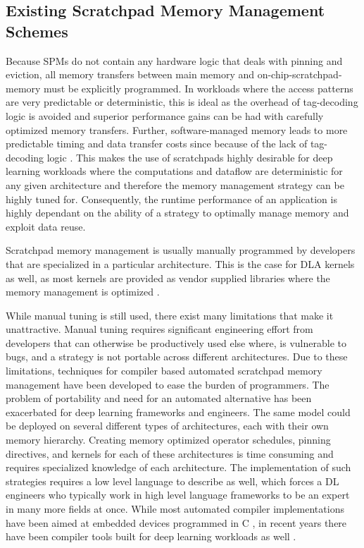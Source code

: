 \subsection{Existing Scratchpad Memory Management Schemes}
Because SPMs do not contain any hardware logic that deals with pinning and
eviction, all memory transfers between main memory and on-chip-scratchpad-memory
must be explicitly programmed. In workloads where the access patterns are very
predictable or deterministic, this is ideal as the overhead of tag-decoding
logic is avoided and superior performance gains can be had with carefully
optimized memory transfers. Further, software-managed memory leads to more
predictable timing and data transfer costs since because of the lack of
tag-decoding logic \cite{graphColoring}. This makes the use of scratchpads
highly desirable for deep learning workloads where the computations and
dataflow are deterministic for any given architecture and therefore the
memory management strategy can be highly tuned for. Consequently,
the runtime performance of an application is highly dependant on the
ability of a strategy to optimally manage memory and exploit data reuse.

Scratchpad memory management is usually manually programmed by developers
that are specialized in a particular architecture. This is the case for
DLA kernels as well, as most kernels are provided as vendor supplied libraries
where the memory management is optimized \cite{TVM}.

While manual tuning is still used, there exist many limitations that make it
unattractive. Manual tuning requires significant engineering effort from
developers that can otherwise be productively used else where, is vulnerable to
bugs, and a strategy is not portable across different architectures.  Due to
these limitations, techniques for compiler based automated scratchpad memory
management have been developed to ease the burden of programmers. The problem
of portability and need for an automated alternative has been exacerbated for
deep learning frameworks and engineers. The same model could be deployed on
several different types of architectures, each with their own memory hierarchy.
Creating memory optimized operator schedules, pinning directives, and kernels
for each of these architectures is time consuming and requires specialized
knowledge of each architecture. The implementation of such strategies requires
a low level language to describe as well, which forces a DL engineers who
typically work in high level language frameworks to be an expert in many more
fields at once.  While most automated compiler implementations have been aimed
at embedded devices programmed in C \cite{graphColoring} \cite{memoryColoring},
in recent years there have been compiler tools built for deep learning
workloads as well \cite{onsram} \cite{toplib}.

